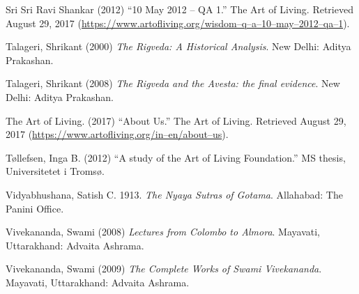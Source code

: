 \begin{thebibliography}{99}
  Sri Sri Ravi Shankar (2012) “10 May 2012 – QA 1.” The Art of Living. Retrieved August 29, 2017 (\url{https://www.artofliving.org/wisdom–q–a–10–may–2012–qa–1}).

  Talageri, Shrikant (2000) \textit{The Rigveda: A Historical Analysis}. New Delhi: Aditya Prakashan.

  Talageri, Shrikant (2008) \textit{The Rigveda and the Avesta: the final evidence}. New Delhi: Aditya Prakashan.

  The Art of Living. (2017) “About Us.” The Art of Living. Retrieved August 29, 2017 (\url{https://www.artofliving.org/in–en/about–us}).

  Tøllefsen, Inga B. (2012) “A study of the Art of Living Foundation.” MS thesis, Universitetet i Tromsø.

  Vidyabhushana, Satish C. 1913. \textit{The Nyaya Sutras of Gotama}. Allahabad: The Panini Office.

  Vivekananda, Swami (2008) \textit{Lectures from Colombo to Almora}. Mayavati, Uttarakhand: Advaita Ashrama.

  Vivekananda, Swami (2009) \textit{The Complete Works of Swami Vivekananda}. Mayavati, Uttarakhand: Advaita Ashrama.

 \end{thebibliography}


